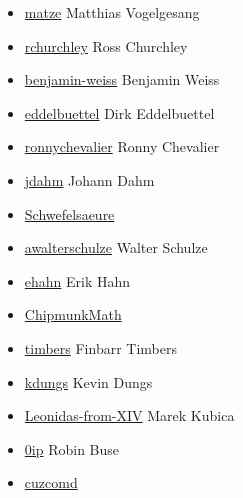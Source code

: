 \begin{itemize}
    \item \href{https://github.com/matze}{matze} Matthias Vogelgesang
    \item \href{https://github.com/rchurchley}{rchurchley} Ross Churchley
    \item \href{https://github.com/benjamin-weiss}{benjamin-weiss} Benjamin Weiss
    \item \href{https://github.com/eddelbuettel}{eddelbuettel} Dirk Eddelbuettel
    \item \href{https://github.com/ronnychevalier}{ronnychevalier} Ronny Chevalier
    \item \href{https://github.com/jdahm}{jdahm} Johann Dahm
    \item \href{https://github.com/Schwefelsaeure}{Schwefelsaeure} 
    \item \href{https://github.com/awalterschulze}{awalterschulze} Walter Schulze
    \item \href{https://github.com/ehahn}{ehahn} Erik Hahn
    \item \href{https://github.com/ChipmunkMath}{ChipmunkMath} 
    \item \href{https://github.com/timbers}{timbers} Finbarr Timbers
    \item \href{https://github.com/kdungs}{kdungs} Kevin Dungs
    \item \href{https://github.com/Leonidas-from-XIV}{Leonidas-from-XIV} Marek Kubica
    \item \href{https://github.com/0ip}{0ip} Robin Buse
    \item \href{https://github.com/cuzcomd}{cuzcomd} 
\end{itemize}
